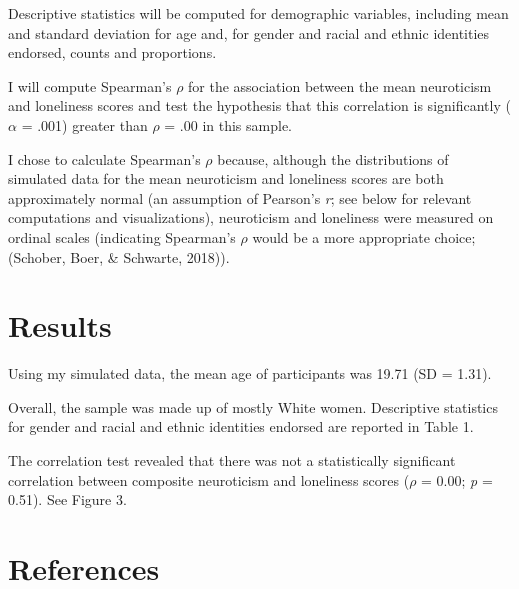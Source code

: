 \documentclass[
  english,
  man]{apa6}
\begin{document}
Descriptive statistics will be computed for demographic variables, including mean and standard deviation for age and, for gender and racial and ethnic identities endorsed, counts and proportions.

I will compute Spearman's \(\rho\) for the association between the mean neuroticism and loneliness scores and test the hypothesis that this correlation is significantly (\(\alpha\) = .001) greater than \(\rho\) = .00 in this sample.

I chose to calculate Spearman's \(\rho\) because, although the distributions of simulated data for the mean neuroticism and loneliness scores are both approximately normal (an assumption of Pearson's \emph{r}; see below for relevant computations and visualizations), neuroticism and loneliness were measured on ordinal scales (indicating Spearman's \(\rho\) would be a more appropriate choice; (Schober, Boer, \& Schwarte, 2018)).

\section{Results}\label{results}

Using my simulated data, the mean age of participants was 19.71 (SD = 1.31).

Overall, the sample was made up of mostly White women. Descriptive statistics for gender and racial and ethnic identities endorsed are reported in Table 1.

The correlation test revealed that there was not a statistically significant correlation between composite neuroticism and loneliness scores (\(\rho\) = 0.00; \emph{p} = 0.51). See Figure 3.

\newpage

\section{References}\label{references}
\end{document}
